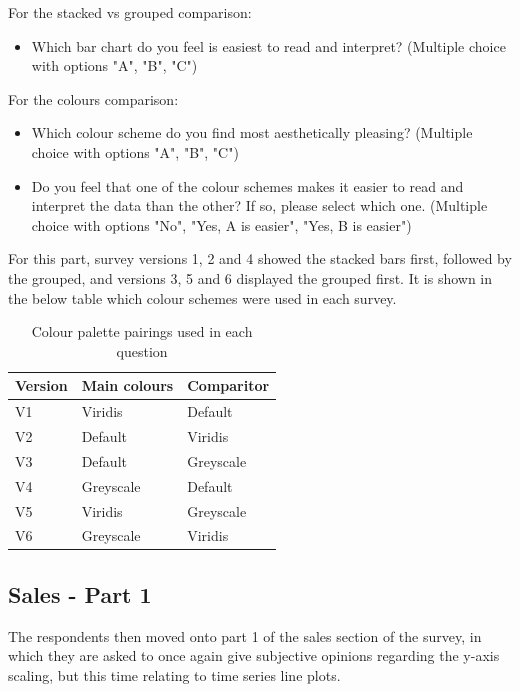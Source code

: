 \documentclass[
  11pt,
]{book}
\begin{document}
For the stacked vs grouped comparison:

\begin{itemize}
  \item Which bar chart do you feel is easiest to read and interpret? (Multiple choice with options "A", "B", "C")
\end{itemize}

For the colours comparison:

\begin{itemize}
  \item Which colour scheme do you find most aesthetically pleasing? (Multiple choice with options "A", "B", "C")
  \item Do you feel that one of the colour schemes makes it easier to read and interpret the data than the other? If so, please select which one. (Multiple choice with options "No", "Yes, A is easier", "Yes, B is easier")
\end{itemize}

For this part, survey versions 1, 2 and 4 showed the stacked bars first,
followed by the grouped, and versions 3, 5 and 6 displayed the grouped
first. It is shown in the below table which colour schemes were used in
each survey.

\begin{center}
\begin{table}

\caption{\label{tab:unnamed-chunk-7}Colour palette pairings used in each question}
\centering
\begin{tabular}[t]{l|l|l}
\hline
Version & Main colours & Comparitor\\
\hline
V1 & Viridis & Default\\
\hline
V2 & Default & Viridis\\
\hline
V3 & Default & Greyscale\\
\hline
V4 & Greyscale & Default\\
\hline
V5 & Viridis & Greyscale\\
\hline
V6 & Greyscale & Viridis\\
\hline
\end{tabular}
\end{table}
\end{center}

\subsection{Sales - Part 1}

The respondents then moved onto part 1 of the sales section of the
survey, in which they are asked to once again give subjective opinions
regarding the y-axis scaling, but this time relating to time series line
plots.
\end{document}

